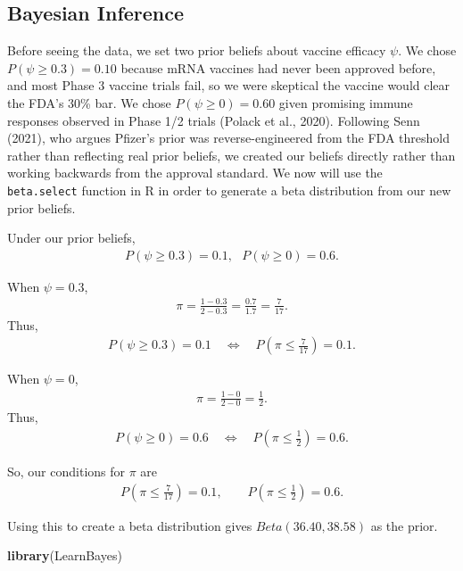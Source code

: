 \documentclass[
  11pt,
]{article}
\newenvironment{Shaded}{\begin{snugshade}}{\end{snugshade}}
\newcommand{\FunctionTok}[1]{\textcolor[rgb]{0.13,0.29,0.53}{\textbf{#1}}}
\newcommand{\NormalTok}[1]{#1}
\begin{document}
\subsection{Bayesian Inference}\label{bayesian-inference}

Before seeing the data, we set two prior beliefs about vaccine efficacy
\(\psi\). We chose \(P(\psi \geq 0.3) = 0.10\) because mRNA vaccines had
never been approved before, and most Phase 3 vaccine trials fail, so we
were skeptical the vaccine would clear the FDA's 30\% bar. We chose
\(P(\psi \geq 0) = 0.60\) given promising immune responses observed in
Phase 1/2 trials (Polack et al., 2020). Following Senn (2021), who
argues Pfizer's prior was reverse-engineered from the FDA threshold
rather than reflecting real prior beliefs, we created our beliefs
directly rather than working backwards from the approval standard. We
now will use the \texttt{beta.select} function in R in order to generate
a beta distribution from our new prior beliefs.

Under our prior beliefs, \begin{align*}
P (\psi \geq 0.3) = 0.1, \ \ \ P (\psi \geq 0) = 0.6.
\end{align*}

When \(\psi = 0.3\), \begin{align*}
\pi = \frac{1-0.3}{2-0.3} = \frac{0.7}{1.7} = \frac{7}{17}.
\end{align*} Thus, \begin{align*}
P(\psi \geq 0.3) = 0.1
\quad \Longleftrightarrow \quad
P\left(\pi \leq \frac{7}{17}\right) = 0.1.
\end{align*}

When \(\psi = 0\), \begin{align*}
\pi = \frac{1-0}{2-0} = \frac{1}{2}.
\end{align*} Thus, \begin{align*}
P(\psi \geq 0) = 0.6
\quad \Longleftrightarrow \quad
P\left(\pi \leq \frac{1}{2}\right) = 0.6.
\end{align*}

So, our conditions for \(\pi\) are \begin{align*}
P\left(\pi \leq \frac{7}{17}\right) = 0.1,
\qquad
P\left(\pi \leq \frac{1}{2}\right) = 0.6.
\end{align*}

Using this to create a beta distribution gives \(Beta (36.40, 38.58)\)
as the prior.

\begin{Shaded}
\begin{Highlighting}[]
\FunctionTok{library}\NormalTok{(LearnBayes)}
\end{Highlighting}
\end{Shaded}
\end{document}
